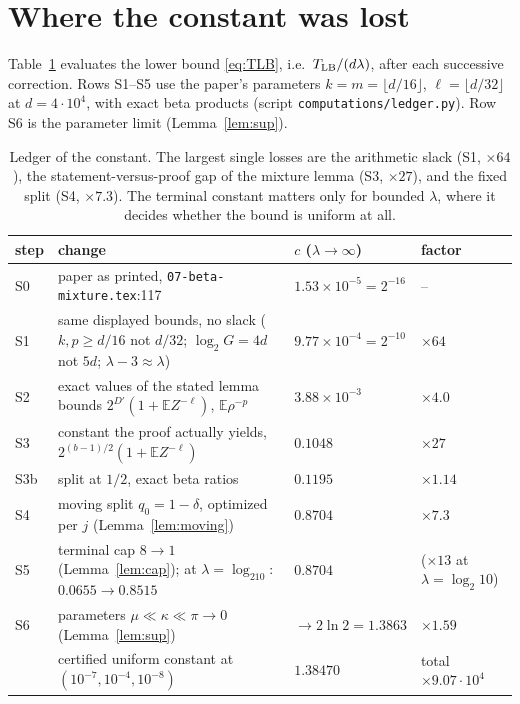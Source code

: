 \documentclass[11pt]{article}
\theoremstyle{definition}
\theoremstyle{remark}
\newcommand{\E}{\mathbb E}
\begin{document}
\section{Where the constant was lost}\label{sec:ledger}

Table~\ref{tab:ledger} evaluates the lower bound \eqref{eq:TLB}, i.e.\ \(T_{\rm LB}/(d\lambda)\), after each successive correction.
Rows S1--S5 use the paper's parameters \(k=m=\lfloor d/16\rfloor\), \(\ell=\lfloor d/32\rfloor\) at \(d=4\cdot10^4\), with exact beta products
(script \texttt{computations/ledger.py}). Row S6 is the parameter limit (Lemma~\ref{lem:sup}).

\begin{table}[h]
\centering\small
\begin{tabular}{@{}lp{8.3cm}ll@{}}
\toprule
step & change & \(c\) (\(\lambda\to\infty\)) & factor\\
\midrule
S0 & paper as printed, \texttt{07-beta-mixture.tex}:117 & \(1.53\times10^{-5}=2^{-16}\) & --\\
S1 & same displayed bounds, no slack (\(k,p\ge d/16\) not \(d/32\); \(\log_2G=4d\) not \(5d\); \(\lambda-3\approx\lambda\)) & \(9.77\times10^{-4}=2^{-10}\) & \(\times64\)\\
S2 & exact values of the stated lemma bounds \(2^{D'}(1+\E Z^{-\ell})\), \(\E\rho^{-p}\) & \(3.88\times10^{-3}\) & \(\times4.0\)\\
S3 & constant the proof actually yields, \(2^{(b-1)/2}(1+\E Z^{-\ell})\) & \(0.1048\) & \(\times27\)\\
S3b & split at \(1/2\), exact beta ratios & \(0.1195\) & \(\times1.14\)\\
S4 & moving split \(q_0=1-\delta\), optimized per \(j\) (Lemma~\ref{lem:moving}) & \(0.8704\) & \(\times7.3\)\\
S5 & terminal cap \(8\to1\) (Lemma~\ref{lem:cap}); at \(\lambda=\log_210\): \(0.0655\to0.8515\) & \(0.8704\) & (\(\times13\) at \(\lambda=\log_2 10\))\\
S6 & parameters \(\mu\ll\kappa\ll\pi\to0\) (Lemma~\ref{lem:sup}) & \(\to2\ln2=1.3863\) & \(\times1.59\)\\
 & certified uniform constant at \((10^{-7},10^{-4},10^{-8})\) & \(1.38470\) & total \(\times9.07\cdot10^4\)\\
\bottomrule
\end{tabular}
\caption{Ledger of the constant. The largest single losses are the arithmetic slack (S1, \(\times64\)), the
statement-versus-proof gap of the mixture lemma (S3, \(\times27\)), and the fixed split (S4, \(\times7.3\)). The terminal
constant matters only for bounded \(\lambda\), where it decides whether the bound is uniform at all.}
\label{tab:ledger}
\end{table}
\end{document}
